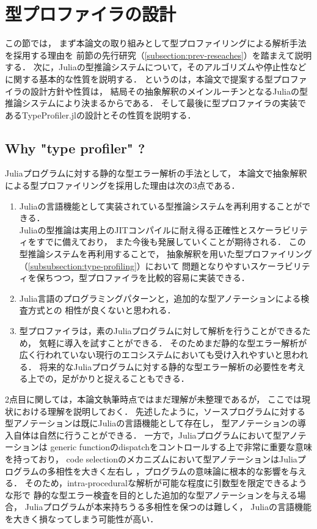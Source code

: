
\section{型プロファイラの設計} \label{section:3}

この節では，
まず本論文の取り組みとして型プロファイリングによる解析手法を採用する理由を
前節の先行研究（\ref{subsection:prev-reseaches}）を踏まえて説明する．
次に，Juliaの型推論システムについて，そのアルゴリズムや停止性などに関する基本的な性質を説明する．
というのは，本論文で提案する型プロファイラの設計方針や性質は，
結局その抽象解釈のメインルーチンとなるJuliaの型推論システムにより決まるからである．
そして最後に型プロファイラの実装であるTypeProfiler.jlの設計とその性質を説明する．

\subsection{Why "type profiler" ?}

Juliaプログラムに対する静的な型エラー解析の手法として，
本論文で抽象解釈による型プロファイリングを採用した理由は次の3点である．

\begin{enumerate}
  \item Juliaの言語機能として実装されている型推論システムを再利用することができる．\\
        Juliaの型推論は実用上のJITコンパイルに耐え得る正確性とスケーラビリティをすでに備えており，
        また今後も発展していくことが期待される．
        この型推論システムを再利用することで，
        抽象解釈を用いた型プロファイリング（\ref{subsubsection:type-profiling}）において
        問題となりやすいスケーラビリティを保ちつつ，型プロファイラを比較的容易に実装できる．
　\item Julia言語のプログラミングパターンと，追加的な型アノテーションによる検査方式との
        相性が良くないと思われる．
  \item 型プロファイラは，素のJuliaプログラムに対して解析を行うことができるため，
        気軽に導入を試すことができる．
        そのためまだ静的な型エラー解析が広く行われていない現行のエコシステムにおいても受け入れやすいと思われる．
        将来的なJuliaプログラムに対する静的な型エラー解析の必要性を考える上での，足がかりと捉えることもできる．
\end{enumerate}

2点目に関しては，本論文執筆時点ではまだ理解が未整理であるが，
ここでは現状における理解を説明しておく．
先述したように，ソースプログラムに対する型アノテーションは既にJuliaの言語機能として存在し，
型アノテーションの導入自体は自然に行うことができる．
一方で，Juliaプログラムにおいて型アノテーションは
generic functionのdispatchをコントロールする上で非常に重要な意味を持っており，
code selectionのメカニズムにおいて型アノテーションはJuliaプログラムの多相性を大きく左右し\footnotemark
，プログラムの意味論に根本的な影響を与える．
そのため，intra-proceduralな解析が可能な程度に引数型を限定できるような形で
静的な型エラー検査を目的とした追加的な型アノテーションを与える場合，
Juliaプログラムが本来持ちうる多相性を保つのは難しく，
Juliaの言語機能を大きく損なってしまう可能性が高い．

